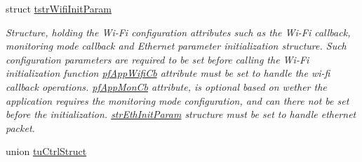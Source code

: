 \begin{DoxyCompactItemize}
struct \hyperlink{structtstrWifiInitParam}{tstr\+Wifi\+Init\+Param}
\begin{DoxyCompactList}\small\item\em Structure, holding the Wi-\/\+Fi configuration attributes such as the Wi-\/\+Fi callback, monitoring mode callback and Ethernet parameter initialization structure. Such configuration parameters are required to be set before calling the Wi-\/\+Fi initialization function \hyperlink{group__WifiSetCustInfoElementFn_ga13d5fa7a0c71fd59bbf36a61923835cc}{pf\+App\+Wifi\+Cb} attribute must be set to handle the wi-\/fi callback operations. \hyperlink{group__WifiSetCustInfoElementFn_gabbd16bbde19ebb6cea2ff732b84421e8}{pf\+App\+Mon\+Cb} attribute, is optional based on wether the application requires the monitoring mode configuration, and can there not be set before the initialization. \hyperlink{group__WifiSetCustInfoElementFn_gac72757e663d13b9c446735a5dca54eb1}{str\+Eth\+Init\+Param} structure must be set to handle ethernet packet. \end{DoxyCompactList}\item 
union \hyperlink{uniontuCtrlStruct}{tu\+Ctrl\+Struct}
\end{DoxyCompactItemize}

